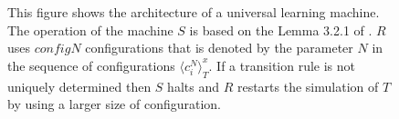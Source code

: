 \cite{Turing}
\cite{Neumann}
\cite{TheorRobopsy}
\cite{WhatIsLife}

\begin{figure}[!h]
\centering
\scalebox{1}{}
\caption{This figure shows the architecture of a universal learning machine. The operation of the machine $S$ is based on the Lemma 3.2.1 of \cite{TheorRobopsy}. $R$ uses $configN$ configurations that is denoted by the parameter $N$ in the sequence of configurations ${\langle c^N_i\rangle}_T^x$. If a transition rule is not uniquely determined then $S$ halts and $R$ restarts the simulation of $T$ by using a larger size of configuration.\label{fig_ULM}}
\end{figure}
